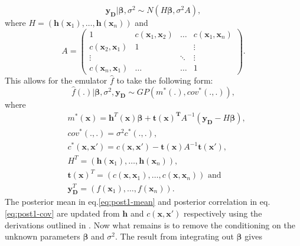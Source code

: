 \documentclass{article}
\newcommand{\simulator}{f}
\newcommand{\emulator}{\hat{f}}
\newcommand{\inputVec}{\mathbf{x}}
\newcommand{\outputVec}{\mathbf{y}}
\newcommand{\basisFuncs}{\mathbf{h}}
\newcommand{\basisCoeffs}{\mathbf{\beta}}
\newcommand{\cov}{cov}
\newcommand{\var}{\sigma^2}
\newcommand{\corr}{c}
\newcommand{\designOutput}{\outputVec_\design}
\newcommand{\design}{\mathbf{D}}
\newcommand{\corrMatrix}{A}
\newcommand{\numDPs}{n}
\newcommand{\GP}{GP}
\begin{document}
\begin{equation}
    \nonumber
    \designOutput | \basisCoeffs, \var \sim N(H \basisCoeffs, \var \corrMatrix),
\end{equation}
where $H = (\basisFuncs(\inputVec_1),\dots,\basisFuncs(\inputVec_\numDPs))$ and 
\begin{equation}
    \label{eq:A}
    \corrMatrix = 
    \begin{pmatrix}
        1 & \corr(\inputVec_1,\inputVec_2) & \dots & \corr(\inputVec_1,\inputVec_\numDPs) \\
        \corr(\inputVec_2,\inputVec_1) & 1 &  & \vdots \\
        \vdots & \ & \ddots & \vdots \\
        \corr(\inputVec_\numDPs,\inputVec_1) & \dots & \dots & 1 
    \end{pmatrix}.
\end{equation}
This allows for the emulator $\emulator$ to take the following form:
\begin{equation}
\nonumber
    \emulator(.)|\basisCoeffs,\var,\designOutput \sim \GP(m^*(.),\cov^*(.,.)),
\end{equation}
where
\begin{align}
    & m^*(\inputVec) = \basisFuncs^T(\inputVec) \basisCoeffs + \mathbf{t(\inputVec)^T} \corrMatrix^{-1} (\mathbf{\designOutput} - H\mathbf{\basisCoeffs}), \label{eq:post1-mean} \\
    & \cov^*(.,.) = \var \corr^*(.,.),\nonumber \\
    & \corr^*(\inputVec,\inputVec') = \corr(\inputVec,\inputVec') - \mathbf{t(\inputVec)} \corrMatrix^{-1} \mathbf{t(\inputVec')}, \label{eq:post1-cov}\\
    & H^T = (\basisFuncs(\inputVec_1),\dots,\basisFuncs(\inputVec_\numDPs)),\nonumber \\
    & \mathbf{t(\inputVec)}^T = \left(\corr(\inputVec,\inputVec_1),\dots,\corr(\inputVec,\inputVec_\numDPs) \right) \text{ and} \nonumber\\
    & \designOutput^T = \left(\simulator(\inputVec_1),\dots,\simulator(\inputVec_\numDPs) \right). \nonumber
\end{align}
The posterior mean in eq.\eqref{eq:post1-mean} and posterior correlation in eq.\eqref{eq:post1-cov} are updated from $\basisFuncs$ and $\corr(\inputVec,\inputVec')$ respectively using the derivations outlined in \citet{Krzanowski1988}.
Now what remains is to remove the conditioning on the unknown parameters $\mathbf{\basisCoeffs}$ and $\var$. The result from integrating out $\basisCoeffs$ gives
\end{document}
